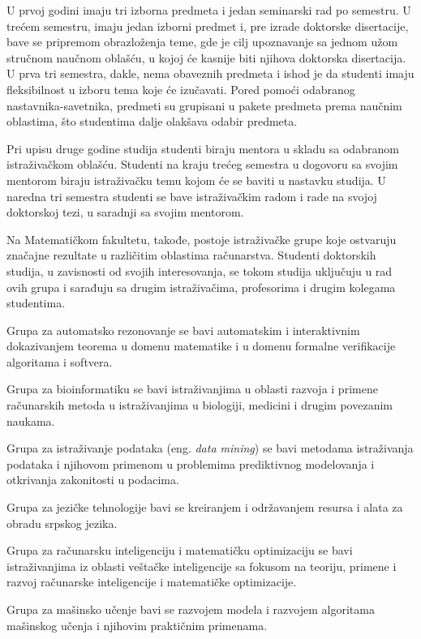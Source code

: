 \documentclass[a4paper]{article}
\begin{document}
U prvoj godini imaju tri izborna predmeta i jedan seminarski rad po semestru. U trećem semestru, imaju jedan izborni predmet i, pre izrade doktorske disertacije, bave se pripremom obrazloženja teme, gde je cilj upoznavanje sa jednom užom stručnom naučnom oblašću, u kojoj će kasnije biti njihova doktorska disertacija. U prva tri semestra, dakle, nema obaveznih predmeta i ishod je da studenti imaju fleksibilnost u izboru tema koje će izučavati. Pored pomoći odabranog nastavnika-savetnika, predmeti su grupisani u pakete predmeta prema naučnim oblastima, što studentima dalje olakšava odabir predmeta.

Pri upisu druge godine studija studenti biraju mentora u skladu sa odabranom istraživačkom oblašću. Studenti na kraju trećeg semestra u dogovoru sa svojim mentorom biraju istraživačku temu kojom će se baviti u nastavku studija. U naredna tri semestra studenti se bave istraživačkim radom i rade na svojoj doktorskoj tezi, u saradnji sa svojim mentorom. 

Na Matematičkom fakultetu, takođe, postoje istraživačke grupe koje ostvaruju značajne rezultate u različitim oblastima računarstva. Studenti doktorskih studija, u zavisnosti od svojih interesovanja, se tokom studija uključuju u rad ovih grupa i sarađuju sa drugim istraživačima, profesorima i drugim kolegama studentima. 

Grupa za automatsko rezonovanje se bavi automatskim i interaktivnim dokazivanjem teorema u domenu matematike i u domenu formalne verifikacije algoritama i softvera.

Grupa za bioinformatiku se bavi istraživanjima u oblasti razvoja i primene računarskih metoda u istraživanjima u biologiji, medicini i drugim povezanim naukama.

Grupa za istraživanje podataka (eng. \emph{data mining}) se bavi metodama istraživanja podataka i njihovom primenom u problemima prediktivnog modelovanja i otkrivanja zakonitosti u podacima.

Grupa za jezičke tehnologije bavi se kreiranjem i održavanjem resursa i alata za obradu srpskog jezika.

Grupa za računarsku inteligenciju i matematičku optimizaciju se bavi istraživanjima iz oblasti veštačke inteligencije sa fokusom na teoriju, primene i razvoj računarske inteligencije i matematičke optimizacije.

Grupa za mašinsko učenje bavi se razvojem modela i razvojem algoritama mašinskog učenja i njihovim praktičnim primenama.
\end{document}
